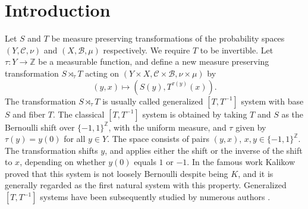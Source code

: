 \documentclass[a4paper,oneside]{amsart}
\renewcommand{\(}{\begin{dmath*}}
\renewcommand{\)}{\end{dmath*}}
\theoremstyle{definition}
\newcommand{\Z}{\mathbb{Z}}
\begin{document}
\section{Introduction}
Let $S$ and $T$ be measure preserving transformations of the probability spaces  $(Y,\mathcal C,\nu)$ and $(X,\mathcal B,\mu)$ respectively. We require $T$ to be invertible. Let  $\tau\colon Y\to\Z$ be a measurable function, and define a new  measure preserving transformation $S\rtimes_\tau T$ acting on  $(Y\times X,\mathcal C\times \mathcal B,\nu\times\mu)$  by 
\begin{equation}\label{TTmenos1}(y,x)\mapsto (S(y),T^{\tau(y)}(x)).\end{equation}
The transformation  $S\rtimes_\tau T$ is usually called generalized $[T,T^{-1}]$ system with base $S$ and fiber $T$.  The classical $[T,T^{-1}]$ system is obtained by taking $T$ and $S$ as the Bernoulli shift over $\{-1,1\}^\Z$, with the uniform measure, and $\tau$  given by $\tau(y)=y(0)$ for all $y\in Y$. The space consists of pairs $(y,x)$, $x,y\in \{-1,1\}^\Z$. The transformation shifts  $y$, and applies either the shift or the inverse of the shift to $x$, depending on whether $y(0)$ equals $1$ or $-1$. In the famous work \cite{kalikow_t_1982} Kalikow proved that this system is not loosely Bernoulli despite being $K$, and it is generally regarded as the first natural system with this property.  Generalized $[T,T^{-1}]$ systems have been subsequently studied by numerous authors \cite{katok_smooth_nodate,rudolph_asymptotically_1988,den_hollander_mixing_1997,hollander_random_2006,dolgopyat_mixing_2022, ball_entropy_2003, heicklen_entropy_2000, dolgopyat_flexibility_2022, austin_scenery_2014}. 
\end{document}
